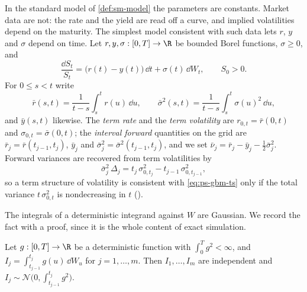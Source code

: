 In the standard model of \cref{def:sm-model} the parameters are constants. Market data
are not: the rate and the yield are read off a curve, and implied volatilities depend on
the maturity. The simplest model consistent with such data lets $r$, $y$ and $\sigma$
depend on time. Let $r,y,\sigma:[0,T]\to\R$ be bounded Borel functions, $\sigma\ge0$, and
\begin{equation}\label{eq:ps-gbm-ts}
  \frac{\dd S_t}{S_t}=\big(r(t)-y(t)\big)\,\dd t+\sigma(t)\,\dd W_t,\qquad S_0>0 .
\end{equation}
For $0\le s<t$ write
\[
  \bar r(s,t)=\frac1{t-s}\int_s^tr(u)\,\dd u,\qquad
  \bar\sigma^2(s,t)=\frac1{t-s}\int_s^t\sigma(u)^2\,\dd u,
\]
and $\bar y(s,t)$ likewise. The \emph{term rate} and the \emph{term volatility} are
$r_{0,t}=\bar r(0,t)$ and $\sigma_{0,t}=\bar\sigma(0,t)$; the \emph{interval forward}
quantities on the grid are $\bar r_j=\bar r(t_{j-1},t_j)$, $\bar y_j$ and
$\bar\sigma_j^2=\bar\sigma^2(t_{j-1},t_j)$, and we set
$\bar\nu_j=\bar r_j-\bar y_j-\tfrac12\bar\sigma_j^2$. Forward variances are recovered from
term volatilities by
\begin{equation}\label{eq:ps-forward-variance}
  \bar\sigma_j^2\,\Delta_j=t_j\,\sigma_{0,t_j}^2-t_{j-1}\,\sigma_{0,t_{j-1}}^2 ,
\end{equation}
so a term structure of volatility is consistent with \eqref{eq:ps-gbm-ts} only if the
total variance $t\,\sigma_{0,t}^2$ is nondecreasing in $t$ ().

The integrals of a deterministic integrand against $W$ are Gaussian. We record the fact
with a proof, since it is the whole content of exact simulation.

\begin{lemma}\label{lem:ps-wiener}
Let $g:[0,T]\to\R$ be a deterministic function with $\int_0^Tg^2<\infty$, and
$I_j=\int_{t_{j-1}}^{t_j}g(u)\,\dd W_u$ for $j=1,\dots,m$. Then $I_1,\dots,I_m$ are
independent and $I_j\sim\mathcal N\big(0,\int_{t_{j-1}}^{t_j}g^2\big)$.
\end{lemma}

